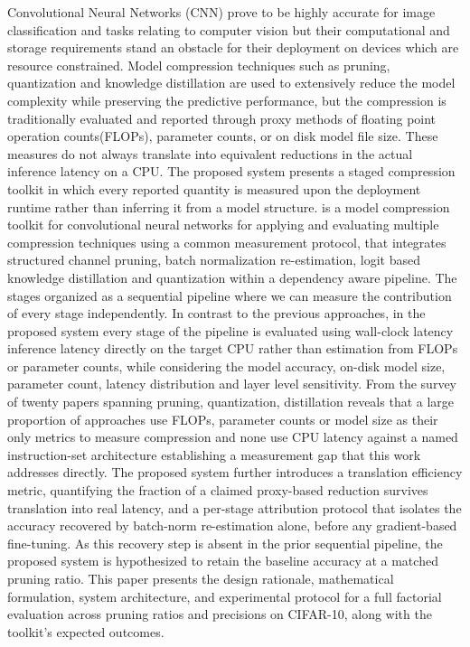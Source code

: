 \documentclass[oneside,a4paper,12pt]{report}
\begin{document}
{   \setlength{\parindent}{11mm} }
{ \setlength{\parindent}{0mm} }
Convolutional Neural Networks (CNN) prove to be highly accurate for image classification and tasks relating to computer vision but their computational and storage requirements stand an obstacle for their deployment on devices which are resource constrained. Model compression techniques such as pruning, quantization and knowledge distillation are used to extensively reduce the model complexity while preserving the predictive performance, but the compression is traditionally evaluated and reported through proxy methods of floating point operation counts(FLOPs), parameter counts, or on disk model file size. These measures do not always translate into equivalent reductions in the actual inference latency on a CPU.
The proposed system presents a staged compression toolkit in which every reported quantity is measured upon the deployment runtime  rather than inferring it from a model structure. is a model compression toolkit for convolutional neural networks for applying and evaluating multiple compression techniques using a common measurement protocol, that integrates structured channel pruning, batch normalization re-estimation, logit based knowledge distillation and quantization within a dependency aware pipeline.  The stages organized as a sequential pipeline where we can measure the contribution of every stage independently. In contrast to the previous approaches, in the proposed system every stage of the pipeline is evaluated using wall-clock latency inference latency directly on the target CPU rather than estimation from FLOPs or parameter counts, while considering the model accuracy, on-disk model size, parameter count, latency distribution and layer level sensitivity.
From the survey of twenty papers spanning pruning, quantization, distillation reveals that a large proportion of approaches use FLOPs, parameter counts or model size as their only metrics to measure compression and none use CPU latency against a named instruction-set architecture establishing a measurement gap that this work addresses directly. The proposed system further introduces a translation efficiency metric, quantifying the fraction of a claimed proxy-based reduction survives translation into real latency, and a per-stage attribution protocol that isolates the accuracy recovered by batch-norm re-estimation alone, before any gradient-based fine-tuning. As this recovery step is absent in the prior sequential pipeline, the proposed system is hypothesized to retain the baseline accuracy at a matched pruning ratio. This paper presents the design rationale, mathematical formulation, system architecture, and experimental protocol for a full factorial evaluation across pruning ratios and precisions on CIFAR-10, along with the toolkit's expected outcomes.
\end{document}
